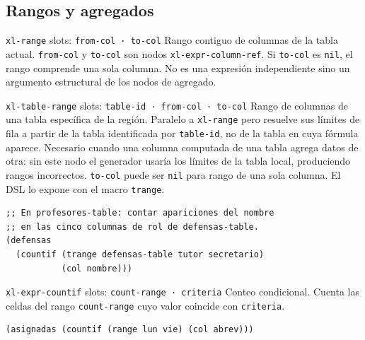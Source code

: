 \documentclass[12pt,a4paper]{report}
\begin{document}
\subsection{Rangos y agregados}

\begin{nodobox}{\texttt{xl-range} \quad \small\textmd{slots:} \texttt{from-col · to-col}}
Rango contiguo de columnas de la tabla actual. \texttt{from-col} y \texttt{to-col} son nodos \texttt{xl-expr-column-ref}. Si \texttt{to-col} es \texttt{nil}, el rango comprende una sola columna. No es una expresión independiente sino un argumento estructural de los nodos de agregado.
\end{nodobox}

\vspace{0.5em}

\begin{nodobox}{\texttt{xl-table-range} \quad \small\textmd{slots:} \texttt{table-id · from-col · to-col}}
Rango de columnas de una tabla específica de la región. Paralelo a \texttt{xl-range} pero resuelve sus límites de fila a partir de la tabla identificada por \texttt{table-id}, no de la tabla en cuya fórmula aparece. Necesario cuando una columna computada de una tabla agrega datos de otra: sin este nodo el generador usaría los límites de la tabla local, produciendo rangos incorrectos. \texttt{to-col} puede ser \texttt{nil} para rango de una sola columna. El DSL lo expone con el macro \texttt{trange}.

\begin{lstlisting}
;; En profesores-table: contar apariciones del nombre
;; en las cinco columnas de rol de defensas-table.
(defensas
  (countif (trange defensas-table tutor secretario)
           (col nombre)))
\end{lstlisting}
\end{nodobox}

\vspace{0.5em}

\begin{nodobox}{\texttt{xl-expr-countif} \quad \small\textmd{slots:} \texttt{count-range · criteria}}
Conteo condicional. Cuenta las celdas del rango \texttt{count-range} cuyo valor coincide con \texttt{criteria}.

\begin{lstlisting}
(asignadas (countif (range lun vie) (col abrev)))
\end{lstlisting}
\end{nodobox}
\end{document}
